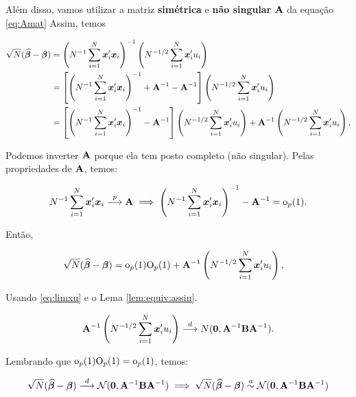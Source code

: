 \documentclass[11pt, oneside, a4paper, article]{article}
\numberwithin{equation}{section}
\begin{document}
\vspace{1 em}
Além disso, vamos utilizar a matriz \textbf{simétrica} e \textbf{não singular} $\mathbf{A}$ da equação \eqref{eq:Amat}
Assim, temos 

\vspace{-1 em}
\begin{align*}
	\sqrt{N} (\widehat{\boldsymbol{\beta}} - \boldsymbol{\beta}) &=
	\left( N^{-1} \sum_{i=1}^{N} \boldsymbol{x}_{i}' \boldsymbol{x}_{i} \right)^{-1}
	\left( N^{-1/2} \sum_{i=1}^{N} \boldsymbol{x}_{i}' u_{i} \right)
	\\ &=
	\left[ 
		\left( N^{-1} \sum_{i=1}^{N} \boldsymbol{x}_{i}' \boldsymbol{x}_{i} \right)^{-1} 
		+ \mathbf{A}^{-1} - \mathbf{A}^{-1}
	\right]
	\left( N^{-1/2} \sum_{i=1}^{N} \boldsymbol{x}_{i}' u_{i} \right)
	\\ &=
	\left[ 
		\left( N^{-1} \sum_{i=1}^{N} \boldsymbol{x}_{i}' \boldsymbol{x}_{i} \right)^{-1} 
		- \mathbf{A}^{-1}
	\right]
	\left( N^{-1/2} \sum_{i=1}^{N} \boldsymbol{x}_{i}' u_{i} \right)
	+ \mathbf{A}^{-1} 
	\left( N^{-1/2} \sum_{i=1}^{N} \boldsymbol{x}_{i}' u_{i} \right),
\end{align*}

\noident
Podemos inverter $\mathbf{A}$ porque ela tem posto completo (não singular).
Pelas propriedades de $\mathbf{A}$, temos:

\vspace{-1 em}
\begin{align*}
	N^{-1} \sum_{i=1}^{N} \boldsymbol{x}_{i}' \boldsymbol{x}_{i}  \overset{p}{\longrightarrow}  \mathbf{A}
	\implies
	\left( N^{-1} \sum_{i=1}^{N} \boldsymbol{x}_{i}' \boldsymbol{x}_{i} \right)^{-1}  - \mathbf{A}^{-1} = \text{o}_{p}(1).
\end{align*}

Então,

\vspace{-1 em}
\begin{align*}
	\sqrt{N} (\widehat{\boldsymbol{\beta}} - \boldsymbol{\beta}) &=
	\text{o}_{p}(1) \text{O}_{p}(1)
	+ \mathbf{A}^{-1} \left( N^{-1/2} \sum_{i=1}^{N} \boldsymbol{x}_{i}' u_{i} \right),
\end{align*}

Usando \eqref{eq:limxu} e o Lema \ref{lem:equiv:assin}.

\begin{align*}
	\mathbf{A}^{-1} \left( N^{-1/2} \sum_{i=1}^{N} \boldsymbol{x}_{i}' u_{i} \right)
	 \overset{d}{\longrightarrow}  
	N(\boldsymbol{0}, \mathbf{A}^{-1} \mathbf{B} \mathbf{A}^{-1}).
\end{align*}

Lembrando que $\text{o}_{p}(1) \text{O}_{p}(1) = \text{o}_{p}(1)$, temos:

\vspace{-1 em}
\begin{align*}
	\sqrt{N} (\widehat{\boldsymbol{\beta}} - \boldsymbol{\beta})  \overset{d}{\longrightarrow}  \mathcal{N}(\boldsymbol{0}, \mathbf{A}^{-1} \mathbf{B} \mathbf{A}^{-1})
	\implies
	\sqrt{N} (\widehat{\boldsymbol{\beta}} - \boldsymbol{\beta}) \overset{a}{\sim} \mathcal{N}(\boldsymbol{0}, \mathbf{A}^{-1} \mathbf{B} \mathbf{A}^{-1})
\end{align*}
\end{document}
